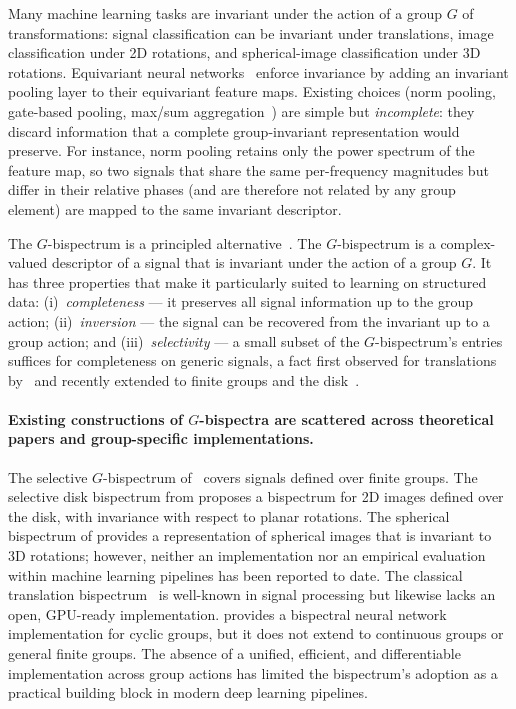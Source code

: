 \documentclass{article}
\theoremstyle{definition}
\theoremstyle{remark}
\theoremstyle{definition}
\begin{document}
Many machine learning tasks are invariant under the action of a group $G$ of transformations: signal classification
can be invariant under translations, image
classification under 2D rotations, and spherical-image classification under 3D rotations. Equivariant neural networks~\citep{cohen2016group, weiler2019general} enforce invariance by adding an invariant pooling layer to their equivariant feature maps.
Existing choices (norm pooling, gate-based pooling, max/sum
aggregation~\citep{weiler2019general}) are simple but
\emph{incomplete}: they discard information that a complete
group-invariant representation would preserve. For instance, norm pooling retains only the power spectrum of the feature map, so two signals that share the same per-frequency magnitudes but differ in their relative phases (and are therefore not related by any group element) are mapped to the same invariant descriptor.

The $G$-bispectrum is a principled
alternative~\citep{giannakis1989bispectrum, kakarala2012bispectrum,
sanborn2023bispectral, mataigne2024selective, myers2025selective}. The $G$-bispectrum is a complex-valued descriptor of a signal that is invariant under the action of a group $G$. It has three properties that make it particularly suited to learning on structured data: (i)~\textit{completeness} --- it preserves all signal
information up to the group action; (ii)~\textit{inversion} --- the signal can be
recovered from the invariant up to a group action; and
(iii)~\textit{selectivity} --- a small subset of the $G$-bispectrum's entries suffices for completeness on generic signals, a fact first observed for translations by~\citet{giannakis1989bispectrum} and recently extended to finite groups and the disk~\citep{mataigne2024selective,myers2025selective}.

\paragraph{Existing constructions of $G$-bispectra are scattered across theoretical papers and group-specific implementations.} The selective $G$-bispectrum
of~\citet{mataigne2024selective} covers signals defined over finite groups. The selective disk bispectrum from
\citet{myers2025selective} proposes a bispectrum for 2D images defined over the disk, with invariance with respect to planar rotations. The spherical bispectrum of \citet{kakarala2012bispectrum} provides a representation of spherical images that is invariant to 3D rotations; however, neither an implementation nor an empirical evaluation within machine learning pipelines has been reported to date. The classical translation bispectrum~\citep{giannakis1989bispectrum} is well-known in signal processing but likewise lacks an open, GPU-ready implementation. \citet{sanborn2023bispectral} provides a bispectral neural network implementation for cyclic groups, but it does not extend to continuous groups or general finite groups. The absence of a unified, efficient, and differentiable implementation across group actions has limited the bispectrum's adoption as a practical building block in modern deep learning pipelines.
\end{document}
